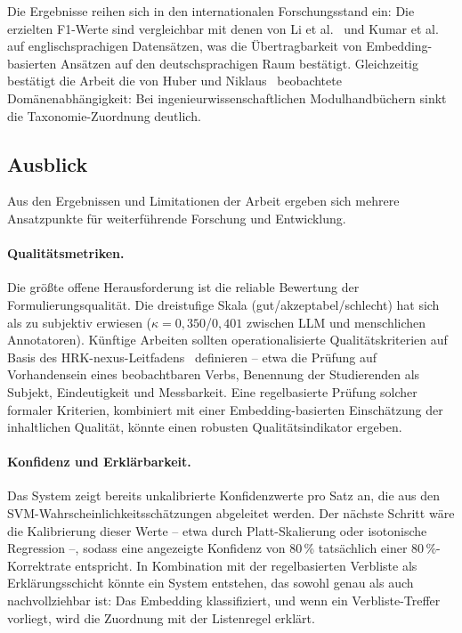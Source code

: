 Die Ergebnisse reihen sich in den internationalen Forschungsstand ein: Die erzielten F1-Werte sind vergleichbar mit denen von Li et al.~\cite{li2022bloomclassification} und Kumar et al.~\cite{kumar2025automated} auf englischsprachigen Datensätzen, was die Übertragbarkeit von Embedding-basierten Ansätzen auf den deutschsprachigen Raum bestätigt.
Gleichzeitig bestätigt die Arbeit die von Huber und Niklaus~\cite{huber2025llmsblooms} beobachtete Domänenabhängigkeit: Bei ingenieurwissenschaftlichen Modulhandbüchern sinkt die Taxonomie-Zuordnung deutlich.

\subsection{Ausblick}\label{sec:ausblick}

Aus den Ergebnissen und Limitationen der Arbeit ergeben sich mehrere Ansatzpunkte für weiterführende Forschung und Entwicklung.

\paragraph{Qualitätsmetriken.}
Die größte offene Herausforderung ist die reliable Bewertung der Formulierungsqualität.
Die dreistufige Skala (gut/akzeptabel/schlecht) hat sich als zu subjektiv erwiesen ($\kappa = 0{,}350$/$0{,}401$ zwischen LLM und menschlichen Annotatoren).
Künftige Arbeiten sollten operationalisierte Qualitätskriterien auf Basis des HRK-nexus-Leitfadens~\cite{hrknexus2015lernergebnisse} definieren -- etwa die Prüfung auf Vorhandensein eines beobachtbaren Verbs, Benennung der Studierenden als Subjekt, Eindeutigkeit und Messbarkeit.
Eine regelbasierte Prüfung solcher formaler Kriterien, kombiniert mit einer Embedding-basierten Einschätzung der inhaltlichen Qualität, könnte einen robusten Qualitätsindikator ergeben.

\paragraph{Konfidenz und Erklärbarkeit.}
Das System zeigt bereits unkalibrierte Konfidenzwerte pro Satz an, die aus den SVM-Wahrscheinlichkeitsschätzungen abgeleitet werden.
Der nächste Schritt wäre die Kalibrierung dieser Werte -- etwa durch Platt-Skalierung oder isotonische Regression --, sodass eine angezeigte Konfidenz von 80\,\% tatsächlich einer 80\,\%-Korrektrate entspricht.
In Kombination mit der regelbasierten Verbliste als Erklärungsschicht könnte ein System entstehen, das sowohl genau als auch nachvollziehbar ist: Das Embedding klassifiziert, und wenn ein Verbliste-Treffer vorliegt, wird die Zuordnung mit der Listenregel erklärt.

